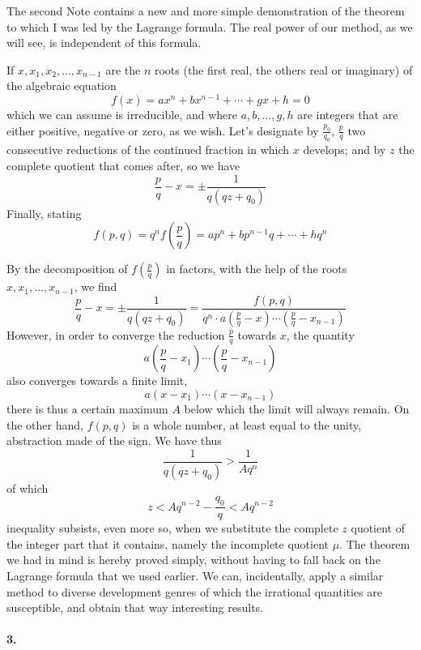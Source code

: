 \documentclass{article}
\begin{document}
The second Note contains a new and more simple demonstration of the theorem to
which I was led by the Lagrange formula. The real power of our method, as we
will see, is independent of this formula.
\begin{displayquote}
  If $x, x_1, x_2, \ldots, x_{n-1}$ are the $n$ roots (the first real, the others real or
  imaginary) of the algebraic equation
    $$f(x) = ax^n + bx^{n-1} + \cdots + gx + h = 0$$
  which we can assume is irreducible, and where $a, b, \ldots, g, h$ are
  integers that are either positive, negative or zero, as we wish. Let’s
  designate by $\frac{p_0}{q_0}$, $\frac{p}{q}$ two consecutive reductions of
  the continued fraction in which $x$ develops; and by $z$ the complete quotient
  that comes after, so we have
    $$\frac{p}{q} - x = \pm\frac{1}{q(qz + q_0)}$$
  Finally, stating
    $$f(p,q) = q^n f(\frac{p}{q}) = ap^n + bp^{n-1}q + \cdots + hq^n$$

  By the decomposition of $f(\frac{p}{q})$ in factors, with the help of the
  roots $x, x_1, \ldots, x_{n-1}$, we find
    $$\frac{p}{q} - x = \pm\frac{1}{q(qz+q_0)}
    = \frac{f(p,q)}{q^n\cdot a\left(\frac{p}{q}
    - x\right)\cdots\left(\frac{p}{q}-x_{n-1}\right)}$$
  However, in order to converge the reduction $\frac{p}{q}$ towards $x$, the
  quantity
    $$a\left(\frac{p}{q} - x_1\right)\cdots\left(\frac{p}{q} - x_{n-1}\right)$$
  also converges towards a finite limit,
    $$a(x-x_1)\cdots(x-x_{n-1})$$
  there is thus a certain maximum $A$ below which the limit will always remain.
  On the other hand, $f(p,q)$ is a whole number, at least equal to the unity,
  abstraction made of the sign. We have thus
    $$\frac{1}{q(qz+q_0)} > \frac{1}{Aq^n}$$
  of which
    $$z < Aq^{n-2} - \frac{q_0}{q} < Aq^{n-2}$$
  inequality subsists, even more so, when we substitute the complete $z$
  quotient of the integer part that it contains, namely the incomplete quotient
  $\mu$. The theorem we had in mind is hereby proved simply, without having to
  fall back on the Lagrange formula that we used earlier. We can, incidentally,
  apply a similar method to diverse development genres of which the irrational
  quantities are susceptible, and obtain that way interesting results.
\end{displayquote}

\paragraph{3.}
\end{document}
